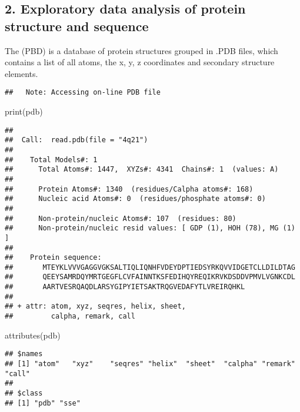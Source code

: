 \documentclass[
]{article}
\newenvironment{Shaded}{\begin{snugshade}}{\end{snugshade}}
\newcommand{\FunctionTok}[1]{\textcolor[rgb]{0.00,0.00,0.00}{#1}}
\newcommand{\NormalTok}[1]{#1}
\newcommand{\SpecialCharTok}[1]{\textcolor[rgb]{0.00,0.00,0.00}{#1}}
\begin{document}
\hypertarget{exploratory-data-analysis-of-protein-structure-and-sequence}{%
\subsection{2. Exploratory data analysis of protein structure and
sequence}\label{exploratory-data-analysis-of-protein-structure-and-sequence}}

The (PBD) is a database of protein structures grouped in .PDB files,
which contains a list of all atoms, the x, y, z coordinates and
secondary structure elements.

\begin{verbatim}
##   Note: Accessing on-line PDB file
\end{verbatim}

\begin{Shaded}
\begin{Highlighting}[]
\FunctionTok{print}\NormalTok{(pdb)}
\end{Highlighting}
\end{Shaded}

\begin{verbatim}
## 
##  Call:  read.pdb(file = "4q21")
## 
##    Total Models#: 1
##      Total Atoms#: 1447,  XYZs#: 4341  Chains#: 1  (values: A)
## 
##      Protein Atoms#: 1340  (residues/Calpha atoms#: 168)
##      Nucleic acid Atoms#: 0  (residues/phosphate atoms#: 0)
## 
##      Non-protein/nucleic Atoms#: 107  (residues: 80)
##      Non-protein/nucleic resid values: [ GDP (1), HOH (78), MG (1) ]
## 
##    Protein sequence:
##       MTEYKLVVVGAGGVGKSALTIQLIQNHFVDEYDPTIEDSYRKQVVIDGETCLLDILDTAG
##       QEEYSAMRDQYMRTGEGFLCVFAINNTKSFEDIHQYREQIKRVKDSDDVPMVLVGNKCDL
##       AARTVESRQAQDLARSYGIPYIETSAKTRQGVEDAFYTLVREIRQHKL
## 
## + attr: atom, xyz, seqres, helix, sheet,
##         calpha, remark, call
\end{verbatim}

\begin{Shaded}
\begin{Highlighting}[]
\FunctionTok{attributes}\NormalTok{(pdb)}
\end{Highlighting}
\end{Shaded}

\begin{verbatim}
## $names
## [1] "atom"   "xyz"    "seqres" "helix"  "sheet"  "calpha" "remark" "call"  
## 
## $class
## [1] "pdb" "sse"
\end{verbatim}

\begin{Shaded}
\end{Shaded}
\end{document}
